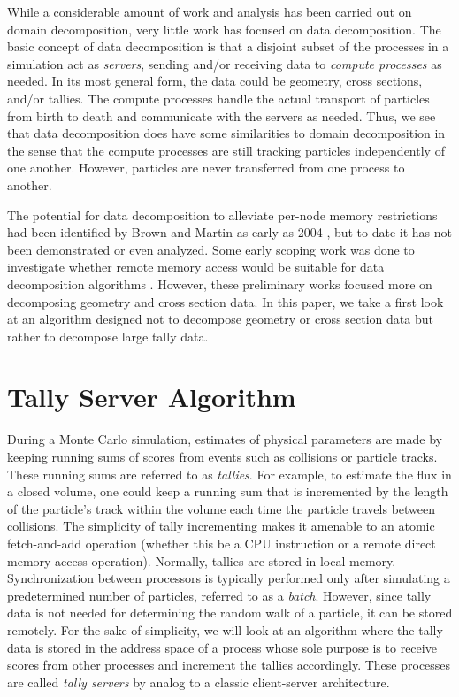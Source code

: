 \documentclass[3p]{elsarticle}
\begin{document}
While a considerable amount of work and analysis has been carried out on domain
decomposition, very little work has focused on data decomposition. The basic
concept of data decomposition is that a disjoint subset of the processes in a
simulation act as \emph{servers}, sending and/or receiving data to \emph{compute
  processes} as needed. In its most general form, the data could be geometry,
cross sections, and/or tallies. The compute processes handle the actual
transport of particles from birth to death and communicate with the servers as
needed. Thus, we see that data decomposition does have some similarities to
domain decomposition in the sense that the compute processes are still tracking
particles independently of one another. However, particles are never transferred
from one process to another.

The potential for data decomposition to alleviate per-node memory restrictions
had been identified by Brown and Martin as early as 2004
\cite{trans-brown-2004}, but to-date it has not been demonstrated or even
analyzed. Some early scoping work was done to investigate whether remote memory
access would be suitable for data decomposition algorithms
\cite{pnst-romano-2011}. However, these preliminary works focused more on
decomposing geometry and cross section data. In this paper, we take a first look
at an algorithm designed not to decompose geometry or cross section data but
rather to decompose large tally data.

\section{Tally Server Algorithm}
\label{sec:algorithm}

During a Monte Carlo simulation, estimates of physical parameters are made by
keeping running sums of scores from events such as collisions or particle
tracks. These running sums are referred to as \emph{tallies}. For example, to
estimate the flux in a closed volume, one could keep a running sum that is
incremented by the length of the particle's track within the volume each time
the particle travels between collisions. The simplicity of tally incrementing
makes it amenable to an atomic fetch-and-add operation (whether this be a CPU
instruction or a remote direct memory access operation). Normally, tallies are
stored in local memory. Synchronization between processors is typically
performed only after simulating a predetermined number of particles, referred to
as a \emph{batch}. However, since tally data is not needed for determining the
random walk of a particle, it can be stored remotely. For the sake of
simplicity, we will look at an algorithm where the tally data is stored in the
address space of a process whose sole purpose is to receive scores from other
processes and increment the tallies accordingly. These processes are called
\emph{tally servers} by analog to a classic client-server architecture.
\end{document}
